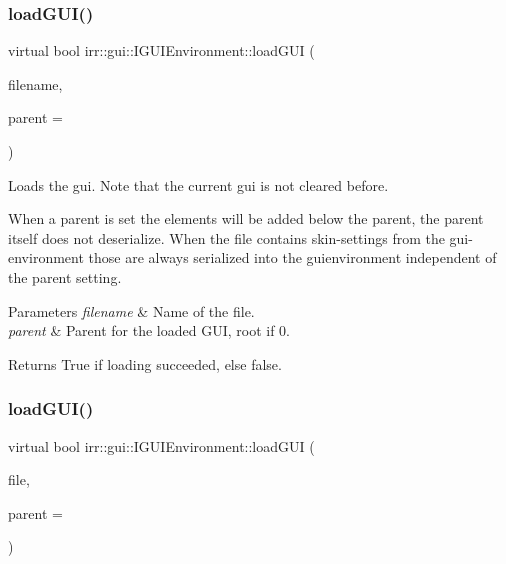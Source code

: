 \subsubsection{\texorpdfstring{load\+G\+U\+I()}{loadGUI()}\hspace{0.1cm}{\footnotesize\ttfamily [2/4]}}
{\footnotesize\ttfamily virtual bool irr\+::gui\+::\+I\+G\+U\+I\+Environment\+::load\+G\+UI (\begin{DoxyParamCaption}\item[{const \hyperlink{namespaceirr_1_1io_a6468281622ce3a1c46b72e19f32dded5}{io\+::path} \&}]{filename,  }\item[{\hyperlink{classirr_1_1gui_1_1IGUIElement}{I\+G\+U\+I\+Element} $\ast$}]{parent = {} }\end{DoxyParamCaption})\hspace{0.3cm}{\ttfamily [pure virtual]}}



Loads the gui. Note that the current gui is not cleared before. 

When a parent is set the elements will be added below the parent, the parent itself does not deserialize. When the file contains skin-\/settings from the gui-\/environment those are always serialized into the guienvironment independent of the parent setting. 
\begin{DoxyParams}{Parameters}
{\em filename} & Name of the file. \\
\hline
{\em parent} & Parent for the loaded G\+UI, root if 0. \\
\hline
\end{DoxyParams}
\begin{DoxyReturn}{Returns}
True if loading succeeded, else false. 
\end{DoxyReturn}
\mbox{\label{classirr_1_1gui_1_1IGUIEnvironment_a23e53c388d45358c53304d095f0b029b}} 
\subsubsection{\texorpdfstring{load\+G\+U\+I()}{loadGUI()}\hspace{0.1cm}{\footnotesize\ttfamily [3/4]}}
{\footnotesize\ttfamily virtual bool irr\+::gui\+::\+I\+G\+U\+I\+Environment\+::load\+G\+UI (\begin{DoxyParamCaption}\item[{\hyperlink{classirr_1_1io_1_1IReadFile}{io\+::\+I\+Read\+File} $\ast$}]{file,  }\item[{\hyperlink{classirr_1_1gui_1_1IGUIElement}{I\+G\+U\+I\+Element} $\ast$}]{parent = {} }\end{DoxyParamCaption})\hspace{0.3cm}{\ttfamily [pure virtual]}}




